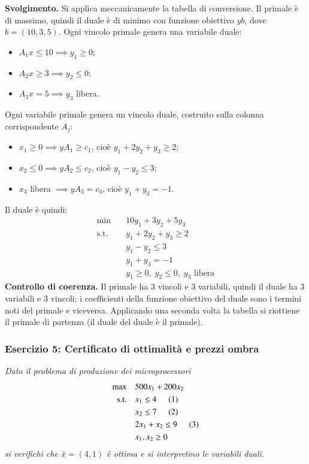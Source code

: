 \documentclass[12pt]{extarticle} %
\begin{document}
\noindent\textbf{Svolgimento.} Si applica meccanicamente la tabella di conversione. Il primale è di massimo, quindi il duale è di minimo con funzione obiettivo $yb$, dove $b = (10,3,5)$. Ogni vincolo primale genera una variabile duale:
\begin{itemize}
    \item $A_1x \le 10 \implies y_1 \ge 0$;
    \item $A_2x \ge 3 \implies y_2 \le 0$;
    \item $A_3x = 5 \implies y_3$ libera.
\end{itemize}
Ogni variabile primale genera un vincolo duale, costruito sulla colonna corrispondente $A_j$:
\begin{itemize}
    \item $x_1 \ge 0 \implies yA_1 \ge c_1$, cioè $y_1 + 2y_2 + y_3 \ge 2$;
    \item $x_2 \le 0 \implies yA_2 \le c_2$, cioè $y_1 - y_2 \le 3$;
    \item $x_3$ libera $\implies yA_3 = c_3$, cioè $y_1 + y_3 = -1$.
\end{itemize}
Il duale è quindi:
\[
\begin{aligned}
\min \quad & 10y_1 + 3y_2 + 5y_3 \\
\text{s.t.} \quad & y_1 + 2y_2 + y_3 \ge 2 \\
& y_1 - y_2 \le 3 \\
& y_1 + y_3 = -1 \\
& y_1 \ge 0, \; y_2 \le 0, \; y_3 \text{ libera}
\end{aligned}
\]
\noindent\textbf{Controllo di coerenza.} Il primale ha 3 vincoli e 3 variabili, quindi il duale ha 3 variabili e 3 vincoli; i coefficienti della funzione obiettivo del duale sono i termini noti del primale e viceversa. Applicando una seconda volta la tabella si riottiene il primale di partenza (il duale del duale è il primale).

\subsubsection{Esercizio 5: Certificato di ottimalità e prezzi ombra}
\textit{Dato il problema di produzione dei microprocessori}
\[
\begin{aligned}
\max \quad & 500x_1 + 200x_2 \\
\text{s.t.} \quad & x_1 \le 4 \hspace{0.5cm}(1)\\
& x_2 \le 7 \hspace{0.5cm}(2)\\
& 2x_1 + x_2 \le 9 \hspace{0.5cm}(3)\\
& x_1, x_2 \ge 0
\end{aligned}
\]
\textit{si verifichi che $\bar{x} = (4,1)$ è ottima e si interpretino le variabili duali.}\\
\end{document}
